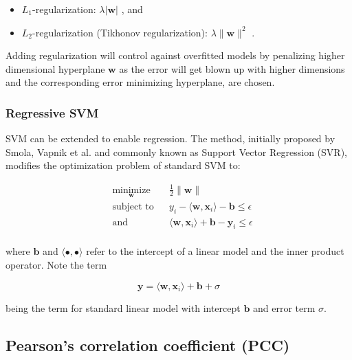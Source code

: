 \documentclass[pdftex,12pt,a4paper]{report}
\begin{document}
\begin{itemize}
\item $L_1$-regularization: $\lambda \vert \mathbf{w} \vert$ \cite{park2007l1}, and
\item $L_2$-regularization (Tikhonov regularization): $\lambda \| \mathbf{w} \|^2$ \cite{tikhonov1977solutions}.
\end{itemize}

Adding regularization will control against overfitted models by penalizing higher dimensional hyperplane $\mathbf{w}$ as the error will get blown up with higher dimensions and the corresponding error minimizing hyperplane, are chosen.

\subsubsection*{Regressive SVM}

SVM can be extended to enable regression. The method, initially proposed by Smola, Vapnik et al. \cite{drucker1997support} and commonly known as Support Vector Regression (SVR), modifies the optimization problem of standard SVM to:

\begin{equation*}
\begin{aligned}
& \underset{\mathbf{
w}}{\text{minimize}}
& & \frac{1}{2} \| \mathbf{w} \| \\
& \text{subject to}
& & y_i - \langle \mathbf{w} , \mathbf{x}_i \rangle - \mathbf{b} \leq \epsilon \\
& \text{and} && \langle \mathbf{w} , \mathbf{x}_i\rangle + \mathbf{b} - \mathbf{y}_i \leq \epsilon \\
\end{aligned}
\end{equation*}

where $\mathbf{b}$ and $\langle \bullet , \bullet \rangle$ refer to the intercept of a linear model and  the inner product operator. Note the term

$$
\mathbf{y} = \langle \mathbf{w} , \mathbf{x}_i \rangle + \mathbf{b} + \sigma
$$

being the term for standard linear model with intercept $\mathbf{b}$  and error term $\sigma$.


\subsection{Pearson's correlation coefficient (PCC)}
\end{document}
